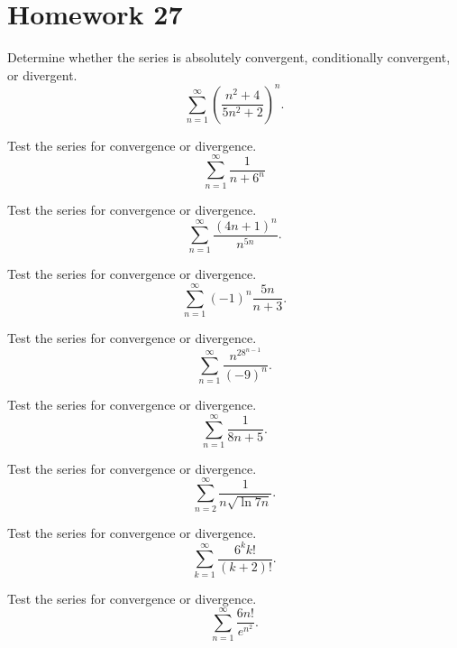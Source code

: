 \section*{Homework 27}
\begin{problem}[WebAssign HW 27, \# 1]
Determine whether the series is absolutely convergent, conditionally
convergent, or divergent.
\[
\sum_{n=1}^\infty\left(\frac{n^2+4}{5n^2+2}\right)^n.
\]
\end{problem}
\begin{problem}[WebAssign HW 27, \# 2]
Test the series for convergence or divergence.
\[
\sum_{n=1}^\infty\frac{1}{n+6^n}
\]
\end{problem}
\begin{problem}[WebAssign HW 27, \# 3]
Test the series for convergence or divergence.
\[
\sum_{n=1}^\infty\frac{(4n+1)^n}{n^{5n}}.
\]
\end{problem}
\begin{problem}[WebAssign HW 27, \# 4]
Test the series for convergence or divergence.
\[
\sum_{n=1}^\infty (-1)^n\frac{5n}{n+3}.
\]
\end{problem}
\begin{problem}[WebAssign HW 27, \# 5]
Test the series for convergence or divergence.
\[
\sum_{n=1}^\infty\frac{n^28^{n-1}}{(-9)^n}.
\]
\end{problem}
\begin{problem}[WebAssign HW 27, \# 6]
Test the series for convergence or divergence.
\[
\sum_{n=1}^\infty \frac{1}{8n+5}.
\]
\end{problem}
\begin{problem}[WebAssign HW 27, \# 7]
Test the series for convergence or divergence.
\[
\sum_{n=2}^\infty\frac{1}{n\sqrt{\ln 7n}}.
\]
\end{problem}
\begin{problem}[WebAssign HW 27, \# 8]
Test the series for convergence or divergence.
\[
\sum_{k=1}^\infty\frac{6^kk!}{(k+2)!}.
\]
\end{problem}
\begin{problem}[WebAssign HW 27, \# 9]
Test the series for convergence or divergence.
\[
\sum_{n=1}^\infty\frac{6n!}{e^{n^2}}.
\]
\end{problem}
